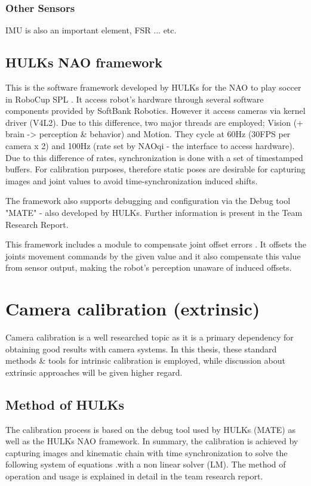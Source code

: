 \documentclass[english, printversion, nomenclature, notitle]{tuvisionthesis} %
\begin{document}
\subsubsection{Other Sensors}
IMU is also an important element, FSR ... etc. 

\subsection{HULKs NAO framework}
This is the software framework developed by HULKs for the NAO to play soccer in RoboCup SPL . It access robot's hardware through several software components provided by SoftBank Robotics. However it access cameras via kernel driver (V4L2). Due to this difference, two major threads are employed; Vision (+ brain -> perception \& behavior) and Motion. They cycle at 60Hz (30FPS per camera x 2) and 100Hz (rate set by NAOqi - the interface to access hardware). Due to this difference of rates, synchronization is done with a set of timestamped buffers. For calibration purposes, therefore static poses are desirable for capturing images and joint values to avoid time-synchronization induced shifts. 

The framework also supports debugging and configuration via the Debug tool "MATE" - also developed by HULKs. Further information is present in the Team Research Report. 

This framework includes a module to compensate joint offset errors . It offsets the joints movement commands by the given value and it also compensate this value from sensor output, making the robot's perception unaware of induced offsets. 

\section{Camera calibration (extrinsic)}
Camera calibration is a well researched topic as it is a primary dependency for obtaining good results with camera systems. In this thesis, these standard methods \& tools for intrinsic calibration is employed, while discussion about extrinsic approaches will be given higher regard.

\subsection{Method of HULKs}

The calibration process is based on the debug tool used by HULKs (MATE) as well as the HULKs NAO framework. In summary, the calibration is achieved by capturing images and kinematic chain with time synchronization to solve the following system of equations .with a non linear solver (LM). The method of operation and usage is explained in detail in the team research report. 
\end{document}
